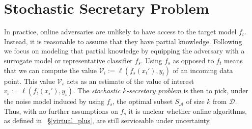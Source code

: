 \section{Stochastic Secretary Problem}
\label{stochastic_k_secretary}
In practice, online adversaries are unlikely to have access to the target model $f_t$.
Instead, it is reasonable to assume that they have partial knowledge. 
Following \cite{papernot2016practical,bose2020adversarial} we focus on modeling that partial knowledge by equipping the adversary with a surrogate model or representative classifier $f_s$. Using $f_s$ as opposed to $f_t$ means that we can compute the value $\mathcal{V}_i:= \ell(f_s(x_i'),y_i)$ of an incoming data point. This value $\mathcal{V}_i$ acts as an estimate of the value of interest $v_i:=\ell(f_t(x_i'),y_i)$. The {\em stochastic $k$-secretary problem} is then to pick, under the noise model induced by using $f_s$, the optimal subset $S_{\mathcal{A}}$ of size $k$ from $\mathcal{D}$. 
Thus, with no further assumptions on $f_s$ it is unclear whether online algorithms, as defined in ~\S\ref{virtual_plus}, are still serviceable under uncertainty.

